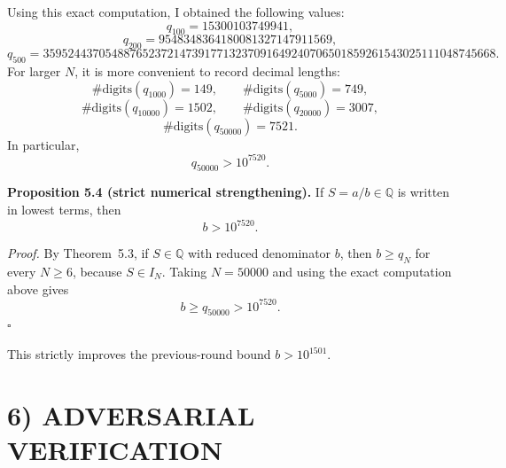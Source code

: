 Using this exact computation, I obtained the following values:
\[
q_{100}=15300103749941,
\]
\[
q_{200}=9548348364180081327147911569,
\]
\[
q_{500}=3595244370548876523721473917713237091649240706501859261543025111048745668.
\]
For larger \(N\), it is more convenient to record decimal lengths:
\[
\#\text{digits}(q_{1000})=149,
\qquad
\#\text{digits}(q_{5000})=749,
\]
\[
\#\text{digits}(q_{10000})=1502,
\qquad
\#\text{digits}(q_{20000})=3007,
\]
\[
\#\text{digits}(q_{50000})=7521.
\]
In particular,
\[
q_{50000}>10^{7520}.
\]

\medskip
\noindent\textbf{Proposition 5.4 (strict numerical strengthening).}
If \(S=a/b\in\mathbb Q\) is written in lowest terms, then
\[
b>10^{7520}.
\]

\emph{Proof.}
By Theorem~5.3, if \(S\in\mathbb Q\) with reduced denominator \(b\), then \(b\ge q_N\) for every \(N\ge 6\), because \(S\in I_N\). Taking \(N=50000\) and using the exact computation above gives
\[
b\ge q_{50000}>10^{7520}.
\]
\hfill$\square$

This strictly improves the previous-round bound \(b>10^{1501}\).

\section*{6) ADVERSARIAL VERIFICATION}

